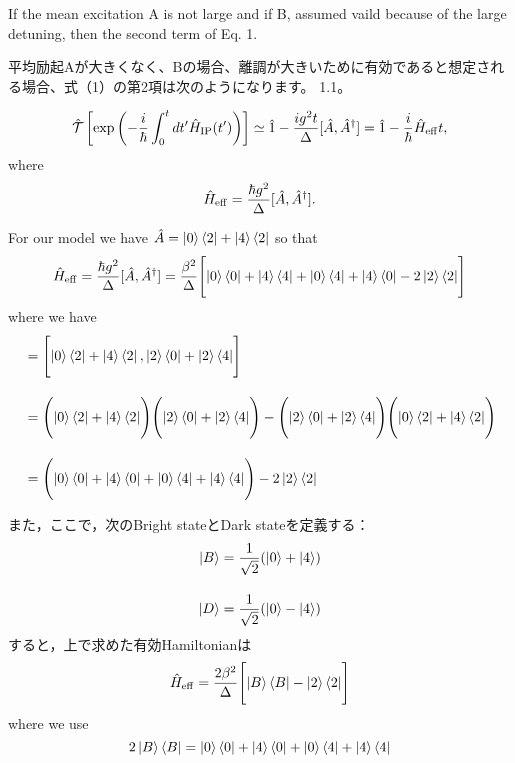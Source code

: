 If the mean excitation A is not large and if B, assumed vaild because of the large detuning, then the second term of Eq. 1.



平均励起Aが大きくなく、Bの場合、離調が大きいために有効であると想定される場合、式（1）の第2項は次のようになります。 1.1。

\begin{equation}
    \hat{\mathcal{T}}\left[
    \exp{\left(
    -\frac{i}{\hbar}\int_0^t dt^\prime \hat{H}_{\rm{IP}}(t^\prime)
    \right)}
    \right]
    \simeq
    \hat{1}-\frac{ig^2t}{\Delta}[\hat{A},\hat{A}^\dagger]
    =\hat{1}-\frac{i}{\hbar}\hat{H}_{\rm{eff}}t,
\end{equation}
where
\begin{equation}
    \hat{H}_{\rm{eff}}=\frac{\hbar g^2}{\Delta}[\hat{A},\hat{A}^\dagger].
\end{equation}

For our model we have $\hat{A}=\ket{0}\bra{2} + \ket{4}\bra{2}$ so that
\begin{equation}
    \hat{H}_{\rm{eff}}=\frac{\hbar g^2}{\Delta}[\hat{A},\hat{A}^\dagger]
    =\frac{\beta^2}{\Delta}
    \Biggl[
    \ket{0}\bra{0} + \ket{4}\bra{4} + \ket{0}\bra{4} + \ket{4}\bra{0} -2 \ket{2}\bra{2}
    \Biggr]
\end{equation}
where we have
\begin{align}
    [\hat{A}, \hat{A}^\dagger]
    &=\Biggl[\ket{0}\bra{2} + \ket{4}\bra{2},\ket{2}\bra{0} + \ket{2}\bra{4}\Biggr]\nn[10pt]
    &=\Biggl(
    \ket{0}\bra{2} + \ket{4}\bra{2}
    \Biggr)
    \Biggl(
    \ket{2}\bra{0} + \ket{2}\bra{4}
    \Biggr)
    -
    \Biggl(
    \ket{2}\bra{0} + \ket{2}\bra{4}
    \Biggr)
    \Biggl(
    \ket{0}\bra{2} + \ket{4}\bra{2}
    \Biggr)
    \nn[10pt]
    &=\Biggl(
    \ket{0}\bra{0} + \ket{4}\bra{0}
    +\ket{0}\bra{4} + \ket{4}\bra{4}
    \Biggr)
    -
    2\ket{2}\bra{2}
\end{align}


また，ここで，次のBright stateとDark stateを定義する：
\begin{align}
    \ket{B} &= \frac{1}{\sqrt{2}}(\ket{0} + \ket{4})\\[10pt]
    \ket{D} &= \frac{1}{\sqrt{2}}(\ket{0} - \ket{4})
\end{align}
すると，上で求めた有効Hamiltonianは
\begin{equation}
    \hat{H}_{\rm{eff}}
    =\frac{2\beta^2}{\Delta}
    \Biggl[
    \ket{B}\bra{B} - \ket{2}\bra{2}
    \Biggr]
\end{equation}
where we use
\begin{equation}
    2\ket{B}\bra{B}
    =\ket{0}\bra{0} + \ket{4}\bra{0}
    +\ket{0}\bra{4} + \ket{4}\bra{4}
\end{equation}

